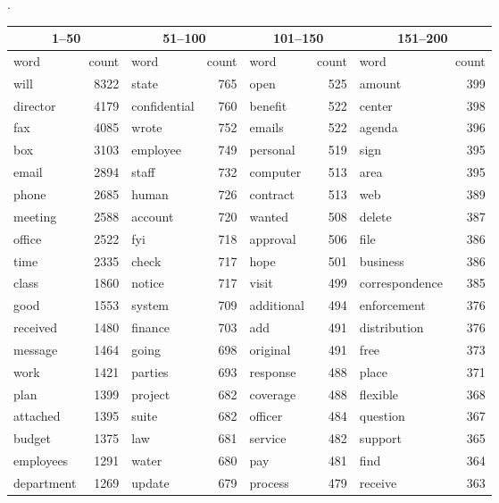 \documentclass{pnastwo}
\begin{document}
\begin{article}
\newpage
.
\begin{table*}
\centering
\begin{tabular}{lr|lr|lr|lr}
 \toprule
 \multicolumn{2}{c}{1--50}& \multicolumn{2}{c}{51--100} & \multicolumn{2}{c}{101--150}& \multicolumn{2}{c}{151--200}\\
 \midrule
 word & count & word & count & word & count & word & count \\ 
  \midrule
 \cellcolor{lred} will & 8322 & \cellcolor{lred} state & 765 & open & 525 & amount & 399 \\ 
   \cellcolor{lred} director & 4179 & confidential & 760 & benefit & 522 & center & 398 \\ 
  \cellcolor{lred} fax & 4085 & wrote & 752 & emails & 522 & agenda & 396 \\ 
  \cellcolor{lred} box & 3103 & employee & 749 & personal & 519 & sign & 395 \\ 
  \cellcolor{lred} email & 2894 & staff & 732 & computer & 513 & area & 395 \\ 
  \cellcolor{lred} phone & 2685 & human & 726 & contract & 513 & web & 389 \\ 
   meeting & 2588 & account & 720 & wanted & 508 & delete & 387 \\ 
   office & 2522 & fyi & 718 & approval & 506 & file & 386 \\ 
   time & 2335 & check & 717 & hope & 501 & business & 386 \\ 
   class & 1860 & notice & 717 & visit & 499 & correspondence & 385 \\ 
   good & 1553 & system & 709 & additional & 494 & enforcement & 376 \\ 
  \cellcolor{lred} received & 1480 & finance & 703 & add & 491 & distribution & 376 \\ 
  \cellcolor{lred} message & 1464 & going & 698 & original & 491 & free & 373 \\ 
   work & 1421 & parties & 693 & response & 488 & place & 371 \\ 
   plan & 1399 & project & 682 & coverage & 488 & flexible & 368 \\ 
   \cellcolor{lred} attached & 1395 & suite & 682 & officer & 484 & question & 367 \\ 
   budget & 1375 & law & 681 & service & 482 & support & 365 \\ 
   employees & 1291 & water & 680 & pay & 481 & find & 364 \\ 
  \cellcolor{lred} department & 1269 & update & 679 & process & 479 & receive & 363 \\ 

\end{tabular}
\end{table*}
\end{article}
\end{document}

